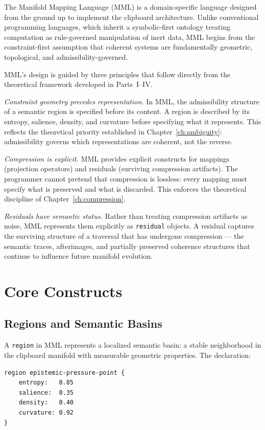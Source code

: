 \documentclass[12pt,oneside]{book}
\theoremstyle{plain}
\theoremstyle{definition}
\theoremstyle{plain}
\begin{document}
The Manifold Mapping Language (MML) is a domain-specific language designed from the ground up to implement the clipboard architecture. Unlike conventional programming languages, which inherit a symbolic-first ontology treating computation as rule-governed manipulation of inert data, MML begins from the constraint-first assumption that coherent systems are fundamentally geometric, topological, and admissibility-governed.

MML's design is guided by three principles that follow directly from the theoretical framework developed in Parts~I--IV.

\emph{Constraint geometry precedes representation.} In MML, the admissibility structure of a semantic region is specified before its content. A region is described by its entropy, salience, density, and curvature before specifying what it represents. This reflects the theoretical priority established in Chapter~\ref{ch:ambiguity}: admissibility governs which representations are coherent, not the reverse.

\emph{Compression is explicit.} MML provides explicit constructs for mappings (projection operators) and residuals (surviving compression artifacts). The programmer cannot pretend that compression is lossless: every mapping must specify what is preserved and what is discarded. This enforces the theoretical discipline of Chapter~\ref{ch:compression}.

\emph{Residuals have semantic status.} Rather than treating compression artifacts as noise, MML represents them explicitly as \texttt{residual} objects. A residual captures the surviving structure of a traversal that has undergone compression — the semantic traces, afterimages, and partially preserved coherence structures that continue to influence future manifold evolution.

\section{Core Constructs}

\subsection{Regions and Semantic Basins}

A \texttt{region} in MML represents a localized semantic basin: a stable neighborhood in the clipboard manifold with measurable geometric properties. The declaration:

\begin{lstlisting}
region epistemic-pressure-point {
    entropy:   0.85
    salience:  0.35
    density:   0.40
    curvature: 0.92
}
\end{lstlisting}
\end{document}
